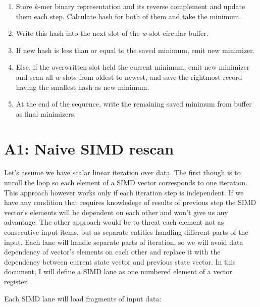 \begin{algorithm}[H]
\caption{Scalar minimap2-style rescan}
\label{alg:rewrite-minimap-rescan}
\small
\begin{enumerate}
  \item Store $k$-mer binary representation and its reverse complement and update them each step. Calculate hash for both of them and take the minimum.
  \item Write this hash into the next slot of the $w$-slot circular buffer.
  \item If new hash is less than or equal to the saved minimum, emit new minimizer.
  \item Else, if the overwritten slot held the current minimum, emit new minimizer and scan all $w$ slots from oldest to newest, and save the
        rightmost record having the smallest hash as new minimum.
  \item At the end of the sequence, write the remaining saved minimum from buffer as final minimizers.
\end{enumerate}
\end{algorithm}

\section{A1: Naive SIMD rescan}
\label{sec:rewrite-naive-simd}

Let's assume we have scalar linear iteration over data. The first though is to unroll the loop so each element of a SIMD vector corresponds to one iteration. This approach however works only if each iteration step is independent.
If we have any condition that requires knowledege of results of previous step the SIMD vector's elements will be dependent on each other and won't give us any advantage. The other approach would be to threat each element not as consecutive input items, but as separate entities handling different parts of the input. Each lane will handle separate parts of iteration, so we will avoid data dependency of vector's elements on each other and replace it with the 
dependency between current state vector and previous state vector.
In this document, I will define a SIMD lane as one numbered element of a vector register.

Each SIMD lane will load fragments of input data:

